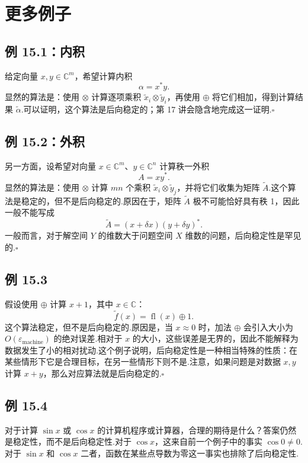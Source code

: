 \documentclass[UTF8,fontset=none,12pt]{ctexart}
\newcommand{\C}{\mathbb{C}}
\newcommand{\epsmach}{\varepsilon_{\mathrm{machine}}}
\newcommand{\fl}{\operatorname{fl}}
\theoremstyle{definition}
\begin{document}
\section*{更多例子}

\subsection*{例 15.1：内积}

给定向量 $x,y\in\C^m$，希望计算内积
\[
    \alpha=x^*y.
\]
显然的算法是：使用 $\otimes$ 计算逐项乘积 $\widetilde x_i\otimes\widetilde y_i$，再使用 $\oplus$ 将它们相加，得到计算结果 $\widetilde\alpha$.可以证明，这个算法是后向稳定的；第 17 讲会隐含地完成这一证明.\hfill$\square$

\subsection*{例 15.2：外积}

另一方面，设希望对向量 $x\in\C^m$、$y\in\C^n$ 计算秩一外积
\[
    A=xy^*.
\]
显然的算法是：使用 $\otimes$ 计算 $mn$ 个乘积 $\widetilde x_i\otimes\widetilde y_j$，并将它们收集为矩阵 $\widetilde A$.这个算法是稳定的，但不是后向稳定的.原因在于，矩阵 $\widetilde A$ 极不可能恰好具有秩 1，因此一般不能写成
\[
    \widetilde A=(x+\delta x)(y+\delta y)^*.
\]
一般而言，对于解空间 $Y$ 的维数大于问题空间 $X$ 维数的问题，后向稳定性是罕见的.\hfill$\square$

\subsection*{例 15.3}

假设使用 $\oplus$ 计算 $x+1$，其中 $x\in\C$：
\[
    \widetilde f(x)=\fl(x)\oplus1.
\]
这个算法稳定，但不是后向稳定的.原因是，当 $x\approx0$ 时，加法 $\oplus$ 会引入大小为 $O(\epsmach)$ 的绝对误差.相对于 $x$ 的大小，这些误差是无界的，因此不能解释为数据发生了小的相对扰动.这个例子说明，后向稳定性是一种相当特殊的性质：在某些情形下它是合理目标，在另一些情形下则不是.注意，如果问题是对数据 $x,y$ 计算 $x+y$，那么对应算法就是后向稳定的.\hfill$\square$

\subsection*{例 15.4}

对于计算 $\sin x$ 或 $\cos x$ 的计算机程序或计算器，合理的期待是什么？答案仍然是稳定性，而不是后向稳定性.对于 $\cos x$，这来自前一个例子中的事实 $\cos0\ne0$.对于 $\sin x$ 和 $\cos x$ 二者，函数在某些点导数为零这一事实也排除了后向稳定性.
\end{document}

